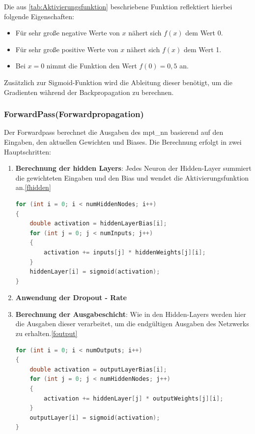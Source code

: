 \documentclass[a4paper, 12pt]{article}
\begin{document}
Die aus \autoref{tab:Aktivierungsfunktion} beschriebene Funktion reflektiert hierbei folgende Eigenschaften:

\begin{itemize}
    \item Für sehr große negative Werte von \( x \) nähert sich \( f(x) \) dem Wert 0.
    \item Für sehr große positive Werte von \( x \) nähert sich \( f(x) \) dem Wert 1.
    \item Bei \( x = 0 \) nimmt die Funktion den Wert \( f(0) = 0{,}5 \) an.
\end{itemize}

Zusätzlich zur Sigmoid-Funktion wird die Ableitung dieser benötigt, um die Gradienten während der Backpropagation zu berechnen.

\subsubsection{ForwardPass(Forwardpropagation)}

Der Forwardpass berechnet die Ausgaben des mpt\_nn basierend auf den Eingaben, den aktuellen Gewichten und Biases. 
Die Berechnung erfolgt in zwei Hauptschritten:

\begin{enumerate}
    \item \textbf{Berechnung der hidden Layers}: Jedes Neuron der Hidden-Layer summiert die gewichteten Eingaben und 
    den Bias und wendet die Aktivierungsfunktion an.\ref{fhidden}
    \begin{lstlisting}[language=C, caption={forwardpass hidden}, label={fhidden}]
for (int i = 0; i < numHiddenNodes; i++)
{
    double activation = hiddenLayerBias[i];
    for (int j = 0; j < numInputs; j++)
    {
        activation += inputs[j] * hiddenWeights[j][i];
    }
    hiddenLayer[i] = sigmoid(activation);
}
    \end{lstlisting}
    \item \textbf{Anwendung der Dropout - Rate}
    \item \textbf{Berechnung der Ausgabeschicht}: Wie in den Hidden-Layers werden hier die Ausgaben dieser verarbeitet, 
    um die endgültigen Ausgaben des Netzwerks zu erhalten.\ref{foutput}
    \begin{lstlisting}[language=C, caption={forwardpass output}, label={foutput}]
for (int i = 0; i < numOutputs; i++)
{
    double activation = outputLayerBias[i];
    for (int j = 0; j < numHiddenNodes; j++)
    {
        activation += hiddenLayer[j] * outputWeights[j][i];
    }
    outputLayer[i] = sigmoid(activation);
}
    \end{lstlisting}

\end{enumerate}
\end{document}
